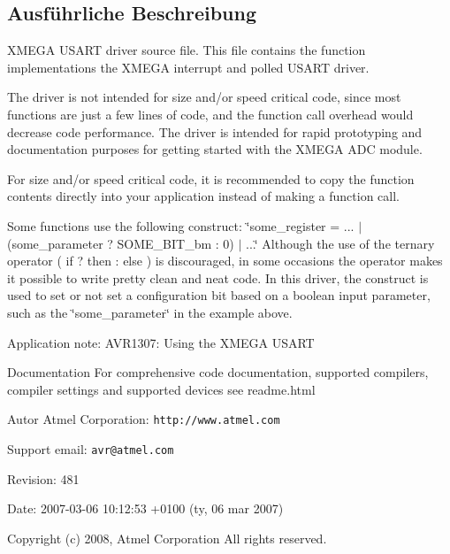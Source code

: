 \subsection{Ausführliche Beschreibung}
XMEGA USART driver source file. This file contains the function implementations the XMEGA interrupt and polled USART driver.

The driver is not intended for size and/or speed critical code, since most functions are just a few lines of code, and the function call overhead would decrease code performance. The driver is intended for rapid prototyping and documentation purposes for getting started with the XMEGA ADC module.

For size and/or speed critical code, it is recommended to copy the function contents directly into your application instead of making a function call.

Some functions use the following construct: \char`\"{}some\_\-register = ... $|$ (some\_\-parameter ? SOME\_\-BIT\_\-bm : 0) $|$ ...\char`\"{} Although the use of the ternary operator ( if ? then : else ) is discouraged, in some occasions the operator makes it possible to write pretty clean and neat code. In this driver, the construct is used to set or not set a configuration bit based on a boolean input parameter, such as the \char`\"{}some\_\-parameter\char`\"{} in the example above.

\begin{DoxyParagraph}{Application note:}
AVR1307: Using the XMEGA USART
\end{DoxyParagraph}
\begin{DoxyParagraph}{Documentation}
For comprehensive code documentation, supported compilers, compiler settings and supported devices see readme.html
\end{DoxyParagraph}
\begin{DoxyAuthor}{Autor}
Atmel Corporation: {\tt http://www.atmel.com} \par
 Support email: {\tt avr@atmel.com}
\end{DoxyAuthor}
\begin{DoxyParagraph}{Revision:}
481 
\end{DoxyParagraph}
\begin{DoxyParagraph}{Date:}
2007-\/03-\/06 10:12:53 +0100 (ty, 06 mar 2007) 
\end{DoxyParagraph}
\par


Copyright (c) 2008, Atmel Corporation All rights reserved.

